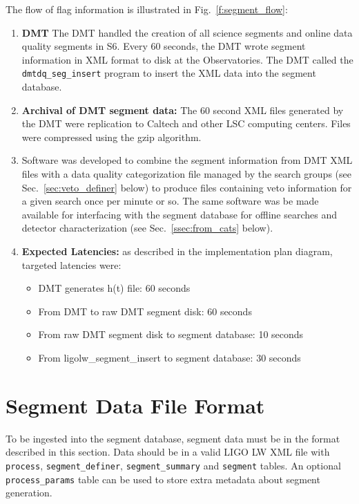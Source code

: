 The flow of flag information is illustrated in
Fig.~\ref{f:segment_flow}:
%
\begin{enumerate}
\item \textbf{DMT} The DMT handled
the creation of all science segments and online data quality segments
in S6. Every 60 seconds, the DMT wrote segment
information in XML format to disk at the Observatories. The DMT called
the \texttt{dmtdq\_seg\_insert} program to insert the XML data into
the segment database.

\item \textbf{Archival of DMT segment data:} The 60 second XML files
generated by the DMT were replication to Caltech and other LSC
computing centers. Files were compressed using the gzip algorithm.

\item Software was developed to combine the segment
information from DMT XML files with a data quality categorization file
managed by the search groups (see Sec.~\ref{sec:veto_definer}
below) to produce files containing veto information for a given search
once per minute or so.  The same software was be made available for
interfacing with the segment database for offline searches and
detector characterization (see Sec.~\ref{ssec:from_cats}
below).

\item \textbf{Expected Latencies:} as described in the implementation plan
diagram, targeted latencies were:
\begin{itemize}
\item DMT generates h(t) file: 60 seconds
\item From DMT to raw DMT segment disk: 60 seconds
\item From raw DMT segment disk to segment database: 10 seconds
\item From ligolw\_segment\_insert to segment database: 30 seconds
\end{itemize}
\end{enumerate}



\section{Segment Data File Format}
\label{sec:data_file_format}

To be ingested into the segment database, segment data must be in the
format described in this section. Data should be in a valid LIGO LW
XML file with \verb|process|, \verb|segment_definer|,
\verb|segment_summary| and \verb|segment| tables. An optional
\verb|process_params| table can be used to store extra metadata about
segment generation.


